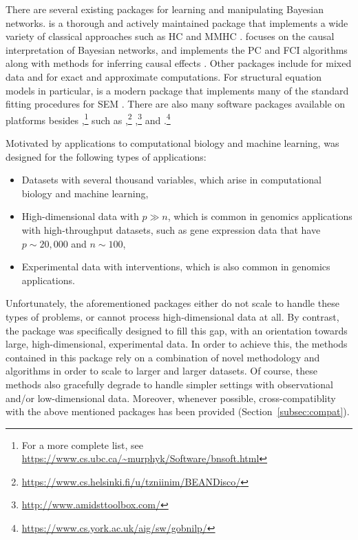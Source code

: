\documentclass[article]{jss}
\renewcommand{\|}{\,|\,}
\begin{document}
There are several existing  packages for learning and manipulating Bayesian networks.  is a thorough and actively maintained package that implements a wide variety of classical approaches such as HC and MMHC \citep{scutari2010}.  focuses on the causal interpretation of Bayesian networks, and implements the PC and FCI algorithms along with methods for inferring causal effects \citep{kalisch2012}. Other packages include  for mixed data \citep{boettcher2003} and  \citep{hojsgaard2012} for exact and approximate computations. For structural equation models in particular,  is a modern  package that implements many of the standard fitting procedures for SEM \citep{rosseel2012}. There are also many software packages available on platforms besides ,\footnote{For a more complete list, see \url{https://www.cs.ubc.ca/~murphyk/Software/bnsoft.html}} such as  \citep{niinimaki2016},\footnote{\url{https://www.cs.helsinki.fi/u/tzniinim/BEANDisco/}}  \citep{masegosa2017},\footnote{\url{http://www.amidsttoolbox.com/}} and  \citep{cussens2017}.\footnote{\url{https://www.cs.york.ac.uk/aig/sw/gobnilp/}}

Motivated by applications to computational biology and machine learning,  was designed for the following types of applications:
\begin{itemize}
\item Datasets with several thousand variables, which arise in computational biology and machine learning,
\item High-dimensional data with $p\gg n$, which is common in genomics applications with high-throughput datasets, such as gene expression data that have $p\sim 20,000$ and $n\sim 100$,
\item Experimental data with interventions, which is also common in genomics applications.
\end{itemize}

\noindent
Unfortunately, the aforementioned packages either do not scale to handle these types of problems, or cannot process high-dimensional data at all. By contrast, the  package was specifically designed to fill this gap, with an orientation towards large, high-dimensional, experimental data. In order to achieve this, the methods contained in this package rely on a combination of novel methodology and algorithms in order to scale to larger and larger datasets. Of course, these methods also gracefully degrade to handle simpler settings with observational and/or low-dimensional data. Moreover, whenever possible, cross-compatiblity with the above mentioned packages has been provided (Section~\ref{subsec:compat}).
\end{document}
